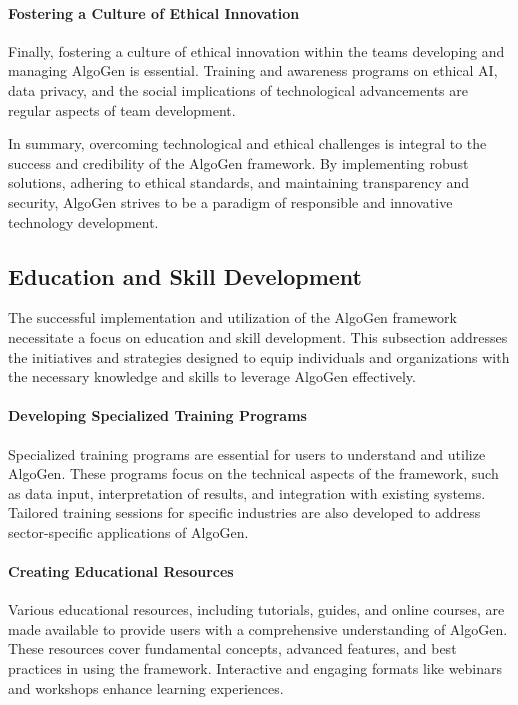 \documentclass{article}
\begin{document}
\paragraph{Fostering a Culture of Ethical Innovation}
Finally, fostering a culture of ethical innovation within the teams developing and managing AlgoGen is essential. Training and awareness programs on ethical AI, data privacy, and the social implications of technological advancements are regular aspects of team development.

In summary, overcoming technological and ethical challenges is integral to the success and credibility of the AlgoGen framework. By implementing robust solutions, adhering to ethical standards, and maintaining transparency and security, AlgoGen strives to be a paradigm of responsible and innovative technology development.



\subsection{Education and Skill Development}
The successful implementation and utilization of the AlgoGen framework necessitate a focus on education and skill development. This subsection addresses the initiatives and strategies designed to equip individuals and organizations with the necessary knowledge and skills to leverage AlgoGen effectively.

\paragraph{Developing Specialized Training Programs}
Specialized training programs are essential for users to understand and utilize AlgoGen. These programs focus on the technical aspects of the framework, such as data input, interpretation of results, and integration with existing systems. Tailored training sessions for specific industries are also developed to address sector-specific applications of AlgoGen.

\paragraph{Creating Educational Resources}
Various educational resources, including tutorials, guides, and online courses, are made available to provide users with a comprehensive understanding of AlgoGen. These resources cover fundamental concepts, advanced features, and best practices in using the framework. Interactive and engaging formats like webinars and workshops enhance learning experiences.
\end{document}
